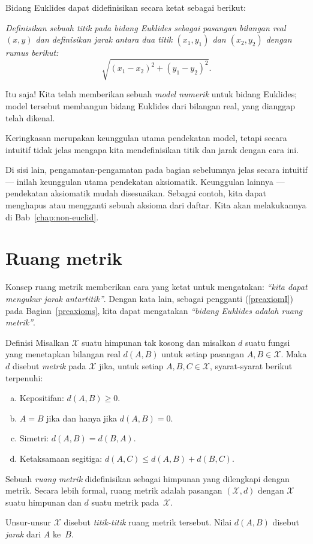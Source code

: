 Bidang Euklides dapat didefinisikan secara ketat sebagai berikut:

\textit{Definisikan sebuah {}\emph{titik} pada bidang Euklides sebagai pasangan bilangan real $(x,y)$ dan definisikan {}\emph{jarak} antara dua titik $(x_1,y_1)$ dan $(x_2,y_2)$ dengan rumus berikut:}
\[\sqrt{(x_1-x_2)^2+(y_1-y_2)^2}.\]

Itu saja!
Kita telah memberikan sebuah {}\emph{model numerik} untuk bidang Euklides;
model tersebut membangun bidang Euklides dari bilangan real, yang dianggap telah dikenal.

Keringkasan merupakan keunggulan utama pendekatan model,
tetapi secara intuitif tidak jelas mengapa kita mendefinisikan titik dan jarak dengan cara ini.

Di sisi lain, pengamatan-pengamatan pada bagian sebelumnya jelas secara intuitif ---
inilah keunggulan utama pendekatan aksiomatik.
Keunggulan lainnya --- pendekatan aksiomatik mudah disesuaikan. 
Sebagai contoh, kita dapat menghapus atau mengganti sebuah aksioma dari daftar. 
Kita akan melakukannya di Bab~\ref{chap:non-euclid}.

\section{Ruang metrik}\label{sec:Metric spaces}

Konsep ruang metrik memberikan 
cara yang ketat untuk mengatakan: \textit{``kita dapat mengukur jarak antartitik''}.
Dengan kata lain, sebagai pengganti (\ref{preaxiomI}) pada Bagian~\ref{preaxioms},
kita dapat mengatakan \textit{``bidang Euklides adalah ruang metrik''}.

\begin{thm}{Definisi}\label{def:metric-space}
Misalkan $\mathcal X$ suatu himpunan tak kosong dan 
misalkan $d$ suatu fungsi
yang menetapkan bilangan real $d(A,B)$
untuk setiap pasangan $A,B\in\mathcal X$.
Maka $d$ disebut \emph{metrik} pada 
$\mathcal X$ jika, untuk setiap
$A,B,C\in \mathcal X$, syarat-syarat berikut terpenuhi:
\begin{enumerate}[(a)]
\item\label{def:metric-space:a} Kepositifan: 
$d(A,B)\ge 0.$
\item\label{def:metric-space:b} $A=B$ jika dan hanya jika 
$d(A,B)=0.$
\item\label{def:metric-space:c} Simetri: $d(A, B) = d(B, A).$
\item\label{def:metric-space:d} Ketaksamaan segitiga: 
$d(A, C) \le d(A, B) + d(B, C).$
\end{enumerate}
Sebuah \emph{ruang metrik} didefinisikan sebagai himpunan yang dilengkapi dengan metrik. 
Secara lebih formal, ruang metrik adalah pasangan $(\mathcal X, d)$ dengan $\mathcal X$ suatu himpunan dan $d$ suatu metrik pada~$\mathcal X$.

Unsur-unsur $\mathcal X$ disebut \emph{titik-titik} ruang metrik tersebut.
Nilai $d(A, B)$ disebut \emph{jarak} dari $A$ ke~$B$.
\end{thm}

